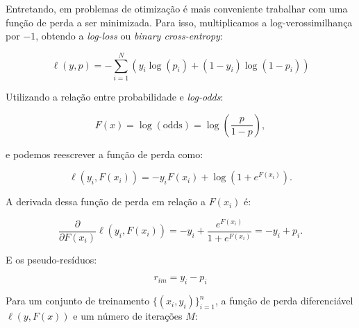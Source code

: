 \documentclass{article}
\begin{document}
Entretando, em problemas de otimização é mais conveniente trabalhar
com uma função de perda a ser minimizada. Para isso, multiplicamos 
a log-verossimilhança por $-1$, obtendo a \textit{log-loss} ou 
\textit{binary cross-entropy}:

\begin{equation*}
    \ell(y,p) = -\sum_{i=1}^{N}\left(y_i \log(p_i) + (1-y_i)\log(1-p_i)\right)
\end{equation*}

Utilizando a relação entre probabilidade e \textit{log-odds}:

\begin{equation}
    F(x) = \log(\text{odds}) = \log\left(\frac{p}{1-p}\right),
\end{equation}

e podemos reescrever a função de perda como:

\begin{equation*}
    \ell(y_i,F(x_i)) = - y_i F(x_i) + \log\left(1 + e^{F(x_i)}\right).
\end{equation*}

A derivada dessa função de perda em relação a $F(x_i)$ é:

\begin{equation*}
    \frac{\partial}{\partial F(x_i)}\ell(y_i,F(x_i)) = - y_i + \frac{e^{F(x_i)}}{1 + e^{F(x_i)}} = - y_i + p_i.
\end{equation*}

E os pseudo-resíduos:

\begin{equation*}
    r_{im} = y_i - p_i
\end{equation*}

Para um conjunto de treinamento $\{(x_i, y_i)\}_{i=1}^{n}$, a função
de perda diferenciável $\ell(y, F(x))$ e um número de iterações $M$:
\end{document}
